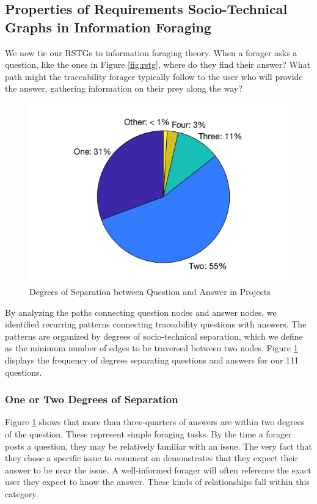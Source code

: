\documentclass[conference]{IEEEtran}
\begin{document}
\subsection{Properties of Requirements Socio-Technical Graphs in Information Foraging}
We now tie our RSTGs to information foraging theory. When a forager asks a question, like the ones in Figure \ref{fig:rstg}, where do they find their answer? What path might the traceability forager typically follow to the user who will provide the answer, gathering information on their prey along the way?

\begin{figure}
	\centering
	\includegraphics[width=\linewidth]{img/pie.png}
	\caption{Degrees of Separation between Question and Answer in Projects}
	\label{fig:pie}
\end{figure}

By analyzing the paths connecting question nodes and answer nodes, we identified recurring patterns connecting traceability questions with answers. The patterns are organized by degrees of socio-technical separation, which we define as the minimum number of edges to be traversed between two nodes. Figure \ref{fig:pie} displays the frequency of degrees separating questions and answers for our 111 questions. 

\subsubsection{One or Two Degrees of Separation}
Figure \ref{fig:pie} shows that more than three-quarters of answers are within two degrees of the question. These represent simple foraging tasks. By the time a forager posts a question, they may be relatively familiar with an issue. The very fact that they chose a specific issue to comment on demonstrates that they expect their answer to be near the issue. A well-informed forager will often reference the exact user they expect to know the answer. These kinds of relationships fall within this category.
\end{document}
